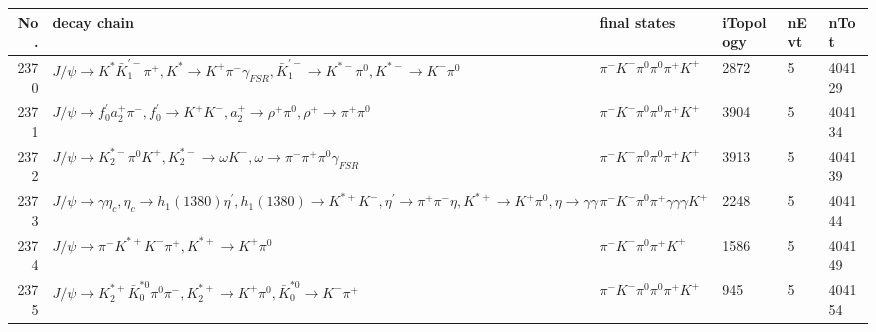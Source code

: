 \begin{table}[htbp] 
\begin{center}
\begin{small}
\begin{tabular}{rlllll}\hline\hline
 No. & decay chain & final states &  iTopology & nEvt & nTot \\\hline
2370&$J/\psi       \rightarrow K^{*}          \bar{K}_1^{'-}\pi^{+}        , K^{*}           \rightarrow K^{+}          \pi^{-}        \gamma_{FSR} , \bar{K}_1^{'-} \rightarrow K^{*-}         \pi^{0}        , K^{*-}          \rightarrow K^{-}          \pi^{0}        $&$\pi^{-}        K^{-}          \pi^{0}        \pi^{0}        \pi^{+}        K^{+}          $& 2872&    5&404129\\
2371&$J/\psi       \rightarrow f^{'}_{0}     a_{2}^{+}      \pi^{-}        , f^{'}_{0}      \rightarrow K^{+}          K^{-}          , a_{2}^{+}       \rightarrow \rho^{+}      \pi^{0}        , \rho^{+}       \rightarrow \pi^{+}        \pi^{0}        $&$\pi^{-}        K^{-}          \pi^{0}        \pi^{0}        \pi^{+}        K^{+}          $& 3904&    5&404134\\
2372&$J/\psi       \rightarrow K_2^{*-}       \pi^{0}        K^{+}          , K_2^{*-}        \rightarrow \omega         K^{-}          , \omega          \rightarrow \pi^{-}        \pi^{+}        \pi^{0}        \gamma_{FSR} $&$\pi^{-}        K^{-}          \pi^{0}        \pi^{0}        \pi^{+}        K^{+}          $& 3913&    5&404139\\
2373&$J/\psi       \rightarrow \gamma       \eta_{c}    , \eta_{c}     \rightarrow h_{1}(1380)    \eta^{\prime} , h_{1}(1380)     \rightarrow K^{*+}         K^{-}          , \eta^{\prime}  \rightarrow \pi^{+}        \pi^{-}        \eta          , K^{*+}          \rightarrow K^{+}          \pi^{0}        , \eta           \rightarrow \gamma       \gamma       $&$\pi^{-}        K^{-}          \pi^{0}        \pi^{+}        \gamma       \gamma       \gamma       K^{+}          $& 2248&    5&404144\\
2374&$J/\psi       \rightarrow \pi^{-}        K^{*+}         K^{-}          \pi^{+}        , K^{*+}          \rightarrow K^{+}          \pi^{0}        $&$\pi^{-}        K^{-}          \pi^{0}        \pi^{+}        K^{+}          $& 1586&    5&404149\\
2375&$J/\psi       \rightarrow K_2^{*+}       \bar{K}_0^{*0}\pi^{0}        \pi^{-}        , K_2^{*+}        \rightarrow K^{+}          \pi^{0}        , \bar{K}_0^{*0} \rightarrow K^{-}          \pi^{+}        $&$\pi^{-}        K^{-}          \pi^{0}        \pi^{0}        \pi^{+}        K^{+}          $&  945&    5&404154\\

\end{tabular}
\end{small}
\end{center}
\end{table}
